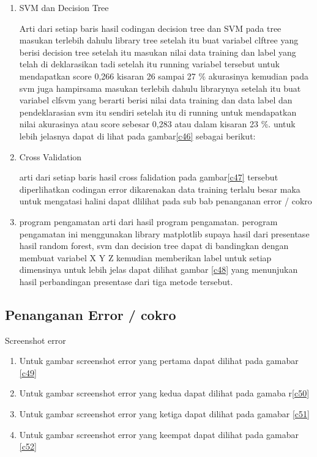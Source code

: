 \begin{enumerate}
\item SVM dan Decision Tree\par
Arti dari setiap baris hasil codingan decision tree dan SVM pada tree masukan terlebih dahulu library tree setelah itu buat variabel clftree yang berisi decision tree setelah itu masukan nilai data training dan label yang telah di deklarasikan tadi setelah itu running variabel tersebut untuk mendapatkan score 0,266 kisaran 26 sampai 27 \% akurasinya kemudian pada svm juga hampirsama masukan terlebih dahulu librarynya setelah itu buat variabel clfsvm yang berarti berisi nilai data training dan data label dan pendeklarasian svm itu sendiri setelah itu di running untuk mendapatkan nilai akurasinya atau score sebesar 0,283 atau dalam kisaran 23 \%. untuk lebih jelasnya dapat di lihat pada gambar\ref{c46} sebagai berikut:

\item Cross Validation\par
arti dari setiap baris hasil cross falidation pada gambar\ref{c47} tersebut diperlihatkan codingan error dikarenakan data training terlalu besar maka untuk mengatasi halini dapat dlilihat pada sub bab penanganan error / cokro

\item program pengamatan
arti dari hasil program pengamatan. perogram pengamatan ini menggunakan library matplotlib supaya hasil dari presentase hasil random forest, svm dan decision tree dapat di bandingkan dengan membuat variabel X Y Z kemudian memberikan label untuk setiap dimensinya untuk lebih jelas dapat dilihat gambar \ref{c48} yang menunjukan hasil perbandingan presentase dari tiga metode tersebut. 
\end{enumerate}

\subsection{Penanganan Error / cokro}
Screenshot error
\begin{enumerate}
\item  Untuk gambar screenshot error yang pertama dapat dilihat pada gamabar \ref{c49}
\item  Untuk gambar screenshot error yang kedua dapat dilihat pada gamaba r\ref{c50}
\item  Untuk gambar screenshot error yang ketiga dapat dilihat pada gamabar \ref{c51}
\item  Untuk gambar screenshot error yang keempat dapat dilihat pada gamabar \ref{c52}
\end{enumerate}

